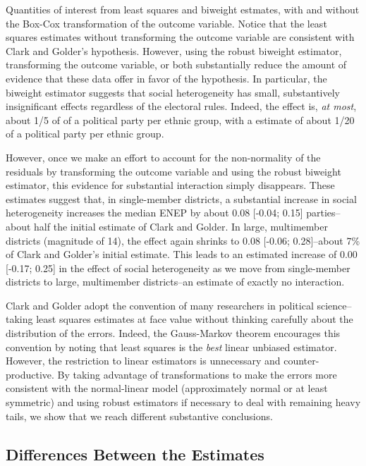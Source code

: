 \documentclass[12pt]{article}
\begin{document}
\begin{table}[H]
{\scriptsize

}
\caption{Quantities of interest from least squares and biweight estmates, with and without the Box-Cox transformation of the outcome variable. Notice that the least squares estimates without transforming the outcome variable are consistent with Clark and Golder's hypothesis. However, using the robust biweight estimator,  transforming the outcome variable, or both substantially reduce the amount of evidence that these data offer in favor of the hypothesis. In particular, the biweight estimator suggests that social heterogeneity has small, substantively insignificant effects regardless of the electoral rules. Indeed, the effect is, \textit{at most}, about 1/5 of of a political party per ethnic group, with a estimate of about 1/20 of a political party per ethnic group. }\label{tab:cg-qi}
\end{table}

However, once we make an effort to account for the non-normality of the residuals by transforming the outcome variable and using the robust biweight estimator, this evidence for substantial interaction simply disappears. These estimates suggest that, in single-member districts, a substantial increase in social heterogeneity increases the median ENEP by about 0.08 [-0.04; 0.15] parties--about half the initial estimate of Clark and Golder. In large, multimember districts (magnitude of 14), the effect again shrinks to 0.08 [-0.06; 0.28]--about 7\% of Clark and Golder's initial estimate. This leads to an estimated increase of 0.00 [-0.17; 0.25] in the effect of social heterogeneity as we move from single-member districts to large, multimember districts--an estimate of exactly no interaction.

Clark and Golder adopt the convention of many researchers in political science--taking least squares estimates at face value without thinking carefully about the distribution of the errors. Indeed, the Gauss-Markov theorem encourages this convention by noting that least squares is the \textit{best} linear unbiased estimator. However, the restriction to linear estimators is unnecessary and counter-productive. By taking advantage of transformations to make the errors more consistent with the normal-linear model (approximately normal or at least symmetric) and using robust estimators if necessary to deal with remaining heavy tails, we show that we reach different substantive conclusions. 

\subsection*{Differences Between the Estimates}
\end{document}
